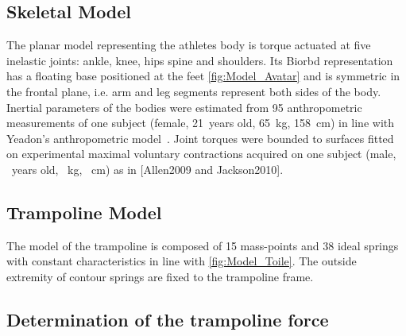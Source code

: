 \subsection{Skeletal Model}\label{subsec:2a}
The planar model representing the athletes body is torque actuated at five inelastic joints: ankle, knee, hips spine and shoulders.
Its Biorbd \cite{michaudBiorbd2021} representation has a floating base positioned at the feet \ref{fig:Model_Avatar} and is symmetric in the frontal plane, i.e. arm and leg segments represent both sides of the body.
Inertial parameters of the bodies were estimated from 95 anthropometric measurements of one subject (female, 21~years old, 65~kg, 158~cm) in line with Yeadon's anthropometric model~\cite{yeadon1990simulation}.
Joint torques were bounded to surfaces fitted on experimental maximal voluntary contractions acquired on one subject (male, ~years old, ~kg, ~cm)  as in [Allen2009 and Jackson2010].



\subsection{Trampoline Model}\label{subsec:2b}
The model of the trampoline is composed of 15 mass-points and 38 ideal springs with constant characteristics in line with \cite{jacques2008determining} \ref{fig:Model_Toile}.
The outside extremity of contour springs are fixed to the trampoline frame.




\subsection{Determination of the trampoline force}\label{subsec:2c}

